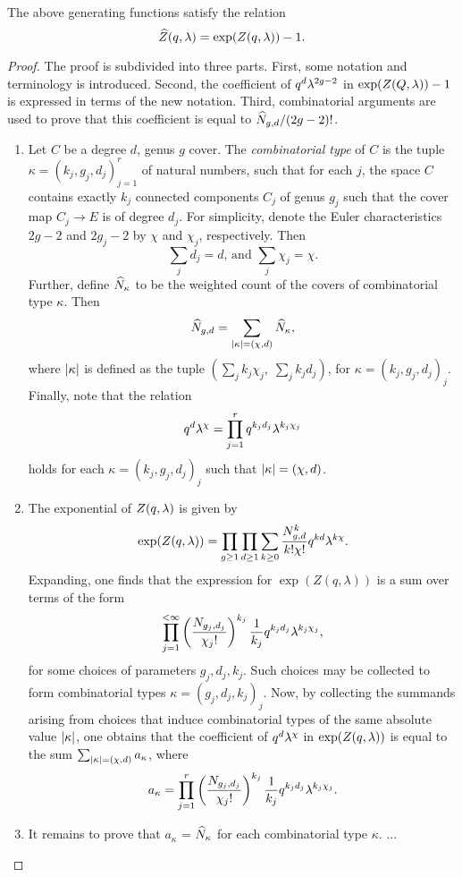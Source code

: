 \begin{lemma} \label{prop:connection-reduction}
 The above generating functions satisfy the relation \[\widehat{Z}(q,\lambda) = \exp(Z(q,\lambda)) - 1.\]
\end{lemma}
\begin{proof}
The proof is subdivided into three parts. First, some notation and terminology is introduced. Second, the coefficient of $q^{d}\lambda^{2g-2}$ in $\exp(Z(Q,\lambda)) - 1$ is expressed in terms of the new notation. Third, combinatorial arguments are used to prove that this coefficient is equal to $\widehat{N}_{g,d}/(2g-2)!$.
\begin{enumerate}

 \item Let $C$ be a degree $d$, genus $g$ cover. The \emph{combinatorial type} of $C$ is the tuple $\kappa=(k_j,g_j,d_j)_{j=1}^r$ of natural numbers, such that for each $j$, the space $C$ contains exactly $k_j$ connected components $C_j$ of genus $g_j$ such that the cover map $C_j\to E$ is of degree $d_j$. For simplicity, denote the Euler characteristics $2g-2$ and $2g_j-2$ by $\chi$ and $\chi_j$, respectively. Then
 \[\sum_j d_j=d\text{, and }\sum_j \chi_j=\chi.\]
 Further, define $\widehat{N}_\kappa$ to be the weighted count of the covers of combinatorial type $\kappa$. Then
 \[
  \widehat{N}_{g,d}=\sum_{|\kappa|=(\chi,d)}\widehat{N}_\kappa,
 \]
 where $|\kappa|$ is defined as the tuple $(\sum_j k_j\chi_j,\;\sum_j k_jd_j)$, for $\kappa=(k_j,g_j,d_j)_j$.
 Finally, note that the relation
 \[
  q^d\lambda^\chi=\prod_{j=1}^r q^{k_jd_j}\lambda^{k_j\chi_j}
 \]
 holds for each $\kappa=(k_j,g_j,d_j)_j$ such that $|\kappa|=(\chi,d)$.
 
 \item The exponential of $Z(q,\lambda)$ is given by 
 \[
  \exp(Z(q,\lambda))=\prod_{g\geq 1}\prod_{d\geq 1}\sum_{k\geq 0}\frac{N^k_{g,d}}{k!\chi!}q^{kd}\lambda^{k\chi}.
 \]
 Expanding, one finds that the expression for $\exp(Z(q,\lambda))$ is a sum over terms of the form
 \[
  \prod_{j=1}^{<\infty}\left(\frac{N_{g_j,d_j}}{\chi_j!}\right)^{k_j}\frac{1}{k_j}q^{k_jd_j}\lambda^{k_j\chi_j},
 \]
 for some choices of parameters $g_j, d_j, k_j$. Such choices may be collected to form combinatorial types $\kappa=(g_j,d_j,k_j)_j$. Now, by collecting the summands arising from choices that induce combinatorial types of the same absolute value $|\kappa|$, one obtains that the coefficient of $q^d\lambda^\chi$ in $\exp(Z(q,\lambda))$ is equal to the sum $\sum_{|\kappa|=(\chi,d)}a_\kappa$, where 
 \[
  a_\kappa=\prod_{j=1}^{r}\left(\frac{N_{g_j,d_j}}{\chi_j!}\right)^{k_j}\frac{1}{k_j}q^{k_jd_j}\lambda^{k_j\chi_j}.
 \]
 
 \item It remains to prove that $a_\kappa$ = $\widehat{N}_\kappa$ for each combinatorial type $\kappa$.
 ...
\end{enumerate}

\end{proof}